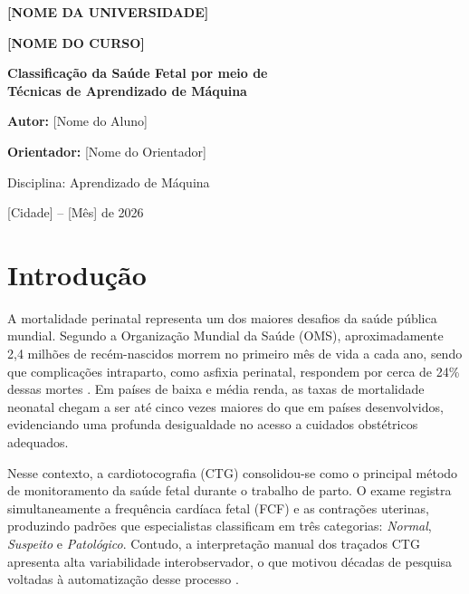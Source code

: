 \documentclass[12pt, a4paper]{article}
\begin{document}
\begin{titlepage}
    \centering
    {\large \textbf{[NOME DA UNIVERSIDADE]}\par}
    \vspace{0.3cm}
    {\large \textbf{[NOME DO CURSO]}\par}
    \vspace{4cm}
    {\LARGE \textbf{Classificação da Saúde Fetal por meio de\\[0.4em]
    Técnicas de Aprendizado de Máquina}\par}
    \vspace{3cm}
    {\large \textbf{Autor:} [Nome do Aluno]\par}
    \vspace{0.4cm}
    {\large \textbf{Orientador:} [Nome do Orientador]\par}
    \vspace{3cm}
    {\large Disciplina: Aprendizado de Máquina\par}
    \vspace{0.5cm}
    {\large [Cidade] -- [Mês] de 2026\par}
\end{titlepage}

\newpage
\tableofcontents
\newpage

\section{Introdução}

A mortalidade perinatal representa um dos maiores desafios da saúde pública mundial. Segundo a
Organização Mundial da Saúde (OMS), aproximadamente 2{,}4 milhões de recém-nascidos morrem
no primeiro mês de vida a cada ano, sendo que complicações intraparto, como asfixia perinatal,
respondem por cerca de 24\% dessas mortes \cite{who2020}. Em países de baixa e média renda,
as taxas de mortalidade neonatal chegam a ser até cinco vezes maiores do que em países
desenvolvidos, evidenciando uma profunda desigualdade no acesso a cuidados obstétricos
adequados.

Nesse contexto, a cardiotocografia (CTG) consolidou-se como o principal método de monitoramento
da saúde fetal durante o trabalho de parto. O exame registra simultaneamente a frequência cardíaca
fetal (FCF) e as contrações uterinas, produzindo padrões que especialistas classificam em três
categorias: \textit{Normal}, \textit{Suspeito} e \textit{Patológico}. Contudo, a interpretação
manual dos traçados CTG apresenta alta variabilidade interobservador, o que motivou décadas de
pesquisa voltadas à automatização desse processo \cite{campos2000}.
\end{document}
